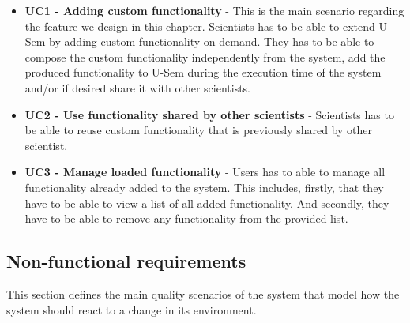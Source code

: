 \begin{itemize}

	\item \textbf{UC1 - Adding custom functionality} - This is the main scenario regarding the feature we design in this chapter. Scientists has to be able to extend U-Sem by adding custom functionality on demand. They has to be able to compose the custom functionality independently from the system, add the produced functionality to U-Sem during the execution time of the system and/or if desired share it with other scientists.
	
	\item \textbf{UC2 - Use functionality shared by other scientists} - Scientists has to be able to reuse custom functionality that is previously shared by other scientist.
	
	\item \textbf{UC3 - Manage loaded functionality} - Users has to able to manage all functionality already added to the system. This includes, firstly, that they have to be able to view a list of all added functionality. And secondly, they have to be able to remove any functionality from the provided list.
			
\end{itemize}

\subsection{Non-functional requirements}

This section defines the main quality scenarios of the system that model how the system should react to a change in its environment.


